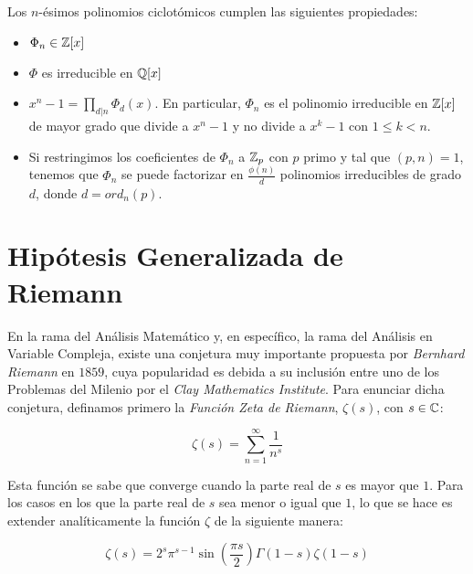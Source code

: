 \begin{proposicion}
	Los $n$-ésimos polinomios ciclotómicos cumplen las siguientes propiedades:
	
	\begin{itemize}
		\item $\Phi_n \in \mathbb{Z}[x]$
		
		\item $\Phi$ es irreducible en $\mathbb{Q}[x]$
		
		\item $x^n - 1 = \prod_{d|n}\Phi_d(x)$. En particular, $\Phi_n$ es el polinomio irreducible en $\mathbb{Z}[x]$ de mayor grado que divide a $x^n - 1$ y no divide a $x^k - 1$ con $1 \leq k < n$.
		
		\item Si restringimos los coeficientes de $\Phi_n$ a $\mathbb{Z}_p$ con $p$ primo y tal que $(p, n) = 1$, tenemos que $\Phi_n$ se puede factorizar en $\frac{\phi(n)}{d}$ polinomios irreducibles de grado $d$, donde $d = ord_n(p)$.
	\end{itemize}
\end{proposicion}

\section{Hipótesis Generalizada de Riemann}

En la rama del Análisis Matemático y, en específico, la rama del Análisis en Variable Compleja, existe una conjetura muy importante propuesta por \textit{Bernhard Riemann} en $1859$, cuya popularidad es debida a su inclusión entre uno de los Problemas del Milenio por el \textit{Clay Mathematics Institute}. Para enunciar dicha conjetura, definamos primero la \textit{Función Zeta de Riemann}, $\zeta(s)$, con $s \in \mathbb{C}$:

\begin{equation}\label{funcion_zeta_de_riemann}
\zeta(s) = \sum_{n=1}^{\infty}\frac{1}{n^s}
\end{equation}

Esta función se sabe que converge cuando la parte real de $s$ es mayor que $1$. Para los casos en los que la parte real de $s$ sea menor o igual que $1$, lo que se hace es extender analíticamente la función $\zeta$ de la siguiente manera:

\begin{equation}\label{funcion_zeta_de_riemann_extendida}
\zeta(s) = 2^s\pi^{s-1}\sin\left(\frac{\pi s}{2}\right)\Gamma(1-s)\zeta(1-s)
\end{equation}

